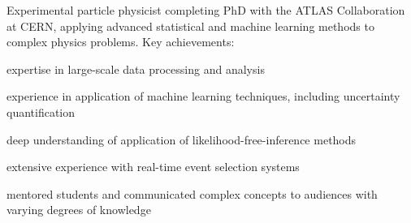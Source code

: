 
Experimental particle physicist completing PhD with the ATLAS Collaboration at CERN, applying advanced statistical and machine learning methods to complex physics problems. Key achievements:

\begin{cvitems}
    \item[]\vspace{-0.5\baselineskip}
    \item expertise in large-scale data processing and analysis
    \item experience in application of machine learning techniques, including uncertainty quantification
    \item deep understanding of application of likelihood-free-inference methods
    \item extensive experience with real-time event selection systems
    \item mentored students and communicated complex concepts to audiences with varying degrees of knowledge
    \item[]\vspace{-0.5\baselineskip}
\end{cvitems}